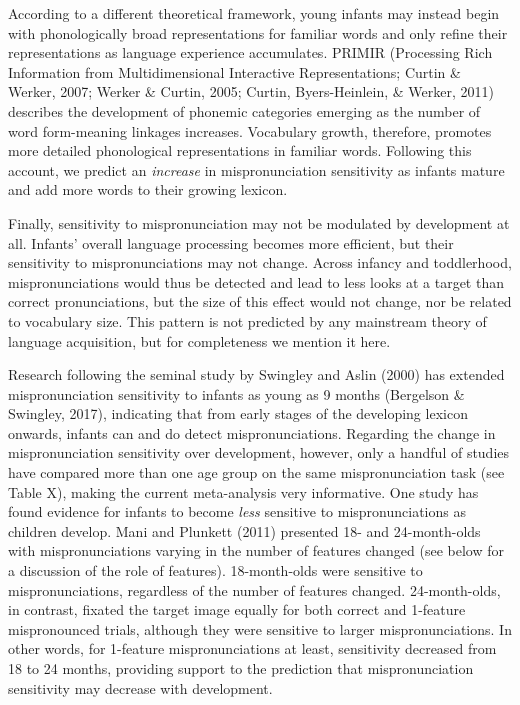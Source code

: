 \documentclass[man]{apa6}
\theoremstyle{definition}
\theoremstyle{definition}
\theoremstyle{definition}
\theoremstyle{remark}
\begin{document}
According to a different theoretical framework, young infants may
instead begin with phonologically broad representations for familiar
words and only refine their representations as language experience
accumulates. PRIMIR (Processing Rich Information from Multidimensional
Interactive Representations; Curtin \& Werker, 2007; Werker \& Curtin,
2005; Curtin, Byers-Heinlein, \& Werker, 2011) describes the development
of phonemic categories emerging as the number of word form-meaning
linkages increases. Vocabulary growth, therefore, promotes more detailed
phonological representations in familiar words. Following this account,
we predict an \emph{increase} in mispronunciation sensitivity as infants
mature and add more words to their growing lexicon.

Finally, sensitivity to mispronunciation may not be modulated by
development at all. Infants' overall language processing becomes more
efficient, but their sensitivity to mispronunciations may not change.
Across infancy and toddlerhood, mispronunciations would thus be detected
and lead to less looks at a target than correct pronunciations, but the
size of this effect would not change, nor be related to vocabulary size.
This pattern is not predicted by any mainstream theory of language
acquisition, but for completeness we mention it here.

Research following the seminal study by Swingley and Aslin (2000) has
extended mispronunciation sensitivity to infants as young as 9 months
(Bergelson \& Swingley, 2017), indicating that from early stages of the
developing lexicon onwards, infants can and do detect mispronunciations.
Regarding the change in mispronunciation sensitivity over development,
however, only a handful of studies have compared more than one age group
on the same mispronunciation task (see Table X), making the current
meta-analysis very informative. One study has found evidence for infants
to become \emph{less} sensitive to mispronunciations as children
develop. Mani and Plunkett (2011) presented 18- and 24-month-olds with
mispronunciations varying in the number of features changed (see below
for a discussion of the role of features). 18-month-olds were sensitive
to mispronunciations, regardless of the number of features changed.
24-month-olds, in contrast, fixated the target image equally for both
correct and 1-feature mispronounced trials, although they were sensitive
to larger mispronunciations. In other words, for 1-feature
mispronunciations at least, sensitivity decreased from 18 to 24 months,
providing support to the prediction that mispronunciation sensitivity
may decrease with development.
\end{document}
